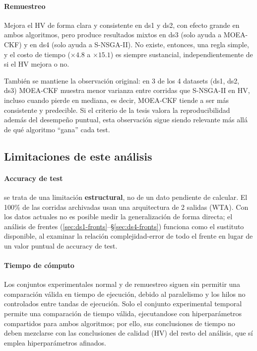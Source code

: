 \paragraph{Remuestreo} Mejora el HV de forma clara y consistente en ds1 y ds2, con efecto grande en ambos algoritmos, pero produce resultados mixtos en ds3 (solo ayuda a MOEA-CKF) y en ds4 (solo ayuda a S-NSGA-II). No existe, entonces, una regla simple, y el costo de tiempo ($\times4.8$ a $\times15.1$) es siempre sustancial, independientemente de si el HV mejora o no.

También se mantiene la observación original: en 3 de los 4 datasets (ds1, ds2, ds3) MOEA-CKF muestra menor varianza entre corridas que S-NSGA-II en HV, incluso cuando pierde en mediana, es decir, MOEA-CKF tiende a ser más consistente y predecible. Si el criterio de la tesis valora la reproducibilidad además del desempeño puntual, esta observación sigue siendo relevante más allá de qué algoritmo ``gana'' cada test.

\subsection{Limitaciones de este análisis}
\label{sec:limitaciones}

\paragraph{Accuracy de test} se trata de una limitación \textbf{estructural}, no de un dato pendiente de calcular. El 100\% de las corridas archivadas usan una arquitectura de 2 salidas (WTA). Con los datos actuales no es posible medir la generalización de forma directa; el análisis de frentes (\ref{sec:ds1-fronts}--\S\ref{sec:ds4-fronts}) funciona como el sustituto disponible, al examinar la relación complejidad-error de todo el frente en lugar de un valor puntual de accuracy de test.

\paragraph{Tiempo de cómputo} Los conjuntos experimentales normal y de remuestreo siguen sin permitir una comparación válida en tiempo de ejecución, debido al paralelismo y los hilos no controlados entre tandas de ejecución. Solo el conjunto experimental temporal permite una comparación de tiempo válida, ejecutandose con hiperparámetros compartidos para ambos algoritmos; por ello, sus conclusiones de tiempo no deben mezclarse con las conclusiones de calidad (HV) del resto del análisis, que sí emplea hiperparámetros afinados.

